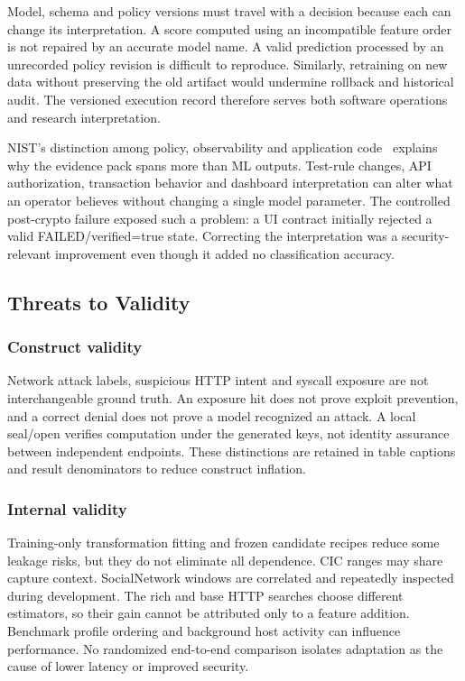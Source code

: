 \documentclass[conference,a4paper]{IEEEtran}
\begin{document}
Model, schema and policy versions must travel with a decision because each can change its interpretation. A score computed using an incompatible feature order is not repaired by an accurate model name. A valid prediction processed by an unrecorded policy revision is difficult to reproduce. Similarly, retraining on new data without preserving the old artifact would undermine rollback and historical audit. The versioned execution record therefore serves both software operations and research interpretation.

NIST's distinction among policy, observability and application code~\cite{devsecops} explains why the evidence pack spans more than ML outputs. Test-rule changes, API authorization, transaction behavior and dashboard interpretation can alter what an operator believes without changing a single model parameter. The controlled post-crypto failure exposed such a problem: a UI contract initially rejected a valid FAILED/verified=true state. Correcting the interpretation was a security-relevant improvement even though it added no classification accuracy.

\subsection{Threats to Validity}
\subsubsection{Construct validity}
Network attack labels, suspicious HTTP intent and syscall exposure are not interchangeable ground truth. An exposure hit does not prove exploit prevention, and a correct denial does not prove a model recognized an attack. A local seal/open verifies computation under the generated keys, not identity assurance between independent endpoints. These distinctions are retained in table captions and result denominators to reduce construct inflation.

\subsubsection{Internal validity}
Training-only transformation fitting and frozen candidate recipes reduce some leakage risks, but they do not eliminate all dependence. CIC ranges may share capture context. SocialNetwork windows are correlated and repeatedly inspected during development. The rich and base HTTP searches choose different estimators, so their gain cannot be attributed only to a feature addition. Benchmark profile ordering and background host activity can influence performance. No randomized end-to-end comparison isolates adaptation as the cause of lower latency or improved security.
\end{document}
